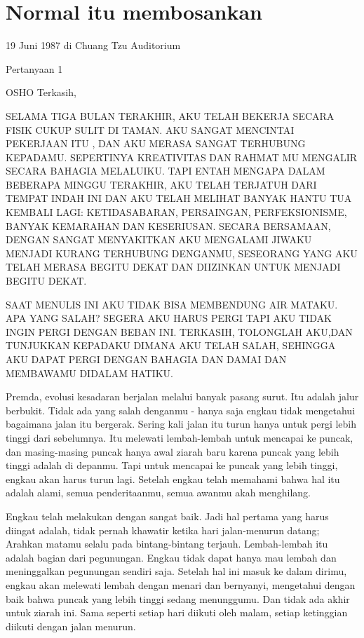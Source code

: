 \chapter{Normal itu membosankan}
19 Juni 1987 di Chuang Tzu Auditorium

Pertanyaan 1

OSHO Terkasih,

SELAMA TIGA BULAN TERAKHIR, AKU TELAH BEKERJA SECARA FISIK CUKUP SULIT DI TAMAN.
AKU SANGAT MENCINTAI PEKERJAAN ITU , DAN AKU MERASA SANGAT TERHUBUNG KEPADAMU.
SEPERTINYA KREATIVITAS DAN RAHMAT MU MENGALIR SECARA BAHAGIA MELALUIKU.
TAPI ENTAH MENGAPA DALAM BEBERAPA MINGGU TERAKHIR,
AKU TELAH TERJATUH DARI TEMPAT INDAH INI DAN AKU TELAH MELIHAT BANYAK HANTU TUA KEMBALI LAGI:
KETIDASABARAN, PERSAINGAN, PERFEKSIONISME, BANYAK KEMARAHAN DAN KESERIUSAN.
SECARA BERSAMAAN, DENGAN SANGAT MENYAKITKAN AKU MENGALAMI JIWAKU MENJADI KURANG TERHUBUNG DENGANMU,
SESEORANG YANG AKU TELAH MERASA BEGITU DEKAT DAN DIIZINKAN UNTUK MENJADI BEGITU DEKAT.

SAAT MENULIS INI AKU TIDAK BISA MEMBENDUNG AIR MATAKU.
APA YANG SALAH? SEGERA AKU HARUS PERGI TAPI AKU TIDAK INGIN PERGI DENGAN BEBAN INI.
TERKASIH, TOLONGLAH AKU,DAN TUNJUKKAN KEPADAKU DIMANA AKU TELAH SALAH,
SEHINGGA AKU DAPAT PERGI DENGAN BAHAGIA DAN DAMAI DAN MEMBAWAMU DIDALAM HATIKU.

Premda, evolusi kesadaran berjalan melalui banyak pasang surut. Itu adalah jalur berbukit. Tidak ada yang salah denganmu - hanya saja engkau tidak mengetahui bagaimana jalan itu bergerak. Sering kali jalan itu turun hanya untuk pergi lebih tinggi dari sebelumnya. Itu melewati lembah-lembah untuk mencapai ke puncak, dan masing-masing puncak hanya awal ziarah baru karena puncak yang lebih tinggi adalah di depanmu. Tapi untuk mencapai ke puncak yang lebih tinggi, engkau akan harus turun lagi. Setelah engkau telah memahami bahwa hal itu adalah alami, semua penderitaanmu, semua awanmu akah menghilang.

Engkau telah melakukan dengan sangat baik. Jadi hal pertama yang harus diingat adalah, tidak pernah khawatir ketika hari jalan-menurun datang; Arahkan matamu selalu pada bintang-bintang terjauh. Lembah-lembah itu adalah bagian dari pegunungan. Engkau tidak dapat hanya mau lembah dan meninggalkan pegunungan sendiri saja. Setelah hal ini masuk ke dalam dirimu, engkau akan melewati lembah dengan menari dan bernyanyi, mengetahui dengan baik bahwa puncak yang lebih tinggi sedang menunggumu. Dan tidak ada akhir untuk ziarah ini. Sama seperti setiap hari diikuti oleh malam, setiap ketinggian diikuti dengan jalan menurun.

